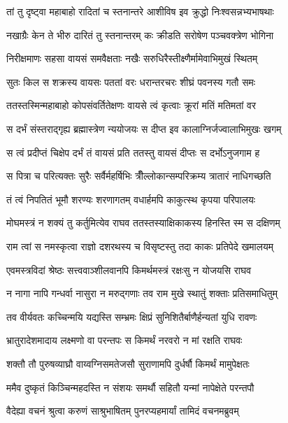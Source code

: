 \twolineshloka
{तां तु दृष्ट्वा महाबाहो रादितां च स्तनान्तरे}
{आशीविष इव क्रुद्धो निःश्वसन्नभ्यभाषथाः} %

\twolineshloka
{नखाग्रैः केन ते भीरु दारितं तु स्तनान्तरम्}
{कः क्रीडति सरोषेण पञ्चवक्त्रेण भोगिना} %

\twolineshloka
{निरीक्षमाणः सहसा वायसं समवैक्षताः}
{नखैः सरुधिरैस्तीक्ष्णैर्मामेवाभिमुखं स्थितम्} %

\twolineshloka
{सुतः किल स शक्रस्य वायसः पततां वरः}
{धरान्तरचरः शीघ्रं पवनस्य गतौ समः} %

\twolineshloka
{ततस्तस्मिन्महाबाहो कोपसंवर्तितेक्षणः}
{वायसे त्वं कृत्वाः क्रूरां मतिं मतिमतां वर} %

\twolineshloka
{स दर्भं संस्तराद्गृह्य ब्रह्मास्त्रेण न्ययोजयः}
{स दीप्त इव कालाग्निर्जज्वालाभिमुखः खगम्} %

\twolineshloka
{स त्वं प्रदीप्तं चिक्षेप दर्भं तं वायसं प्रति}
{ततस्तु वायसं दीप्तः स दर्भोऽनुजगाम ह} %

\twolineshloka
{स पित्रा च परित्यक्तः सुरैः सर्वैर्महर्षिभिः}
{त्रीँल्लोकान्सम्परिक्रम्य त्रातारं नाधिगच्छति} %

\twolineshloka
{तं त्वं निपतितं भूमौ शरण्यः शरणागतम्}
{वधार्हमपि काकुत्स्थ कृपया परिपालयः} %

\twolineshloka
{मोघमस्त्रं न शक्यं तु कर्तुमित्येव राघव}
{ततस्तस्याक्षिकाकस्य हिनस्ति स्म स दक्षिणम्} %

\twolineshloka
{राम त्वां स नमस्कृत्वा राज्ञो दशरथस्य च}
{विसृष्टस्तु तदा काकः प्रतिपेदे खमालयम्} %

\twolineshloka
{एवमस्त्रविदां श्रेष्ठः सत्त्ववाञ्शीलवानपि}
{किमर्थमस्त्रं रक्षःसु न योजयसि राघव} %

\twolineshloka
{न नागा नापि गन्धर्वा नासुरा न मरुद्गणाः}
{तव राम मुखे स्थातुं शक्ताः प्रतिसमाधितुम्} %

\twolineshloka
{तव वीर्यवतः कच्चिन्मयि यद्यस्ति सम्भ्रमः}
{क्षिप्रं सुनिशितैर्बाणैर्हन्यतां युधि रावणः} %

\twolineshloka
{भ्रातुरादेशमादाय लक्ष्मणो वा परन्तपः}
{स किमर्थं नरवरो न मां रक्षति राघवः} %

\twolineshloka
{शक्तौ तौ पुरुषव्याघ्रौ वाय्वग्निसमतेजसौ}
{सुराणामपि दुर्धर्षौ किमर्थं मामुपेक्षतः} %

\twolineshloka
{ममैव दुष्कृतं किञ्चिन्महदस्ति न संशयः}
{समर्थौ सहितौ यन्मां नापेक्षेते परन्तपौ} %

\twolineshloka
{वैदेह्या वचनं श्रुत्वा करुणं साश्रुभाषितम्}
{पुनरप्यहमार्यां तामिदं वचनमब्रुवम्} %

